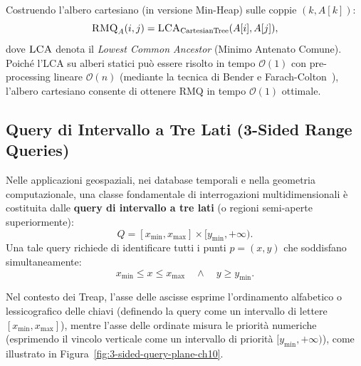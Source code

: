 Costruendo l'albero cartesiano (in versione Min-Heap) sulle coppie $(k, A[k])$:
\begin{equation}
  \textsc{RMQ}_A(i, j) = \textsc{LCA}_{\text{CartesianTree}}(A[i], A[j]),
\end{equation}
dove $\textsc{LCA}$ denota il \textit{Lowest Common Ancestor} (Minimo Antenato Comune). Poich\'e l'LCA su alberi statici pu\`o essere risolto in tempo $\mathcal{O}(1)$ con pre-processing lineare $\mathcal{O}(n)$ (mediante la tecnica di Bender e Farach-Colton~\cite{bender2000}), l'albero cartesiano consente di ottenere RMQ in tempo $\mathcal{O}(1)$ ottimale.

\subsection{Query di Intervallo a Tre Lati (3-Sided Range Queries)}
Nelle applicazioni geospaziali, nei database temporali e nella geometria computazionale, una classe fondamentale di interrogazioni multidimensionali \`e costituita dalle \textbf{query di intervallo a tre lati} (o regioni semi-aperte superiormente):
\begin{equation}
  Q = [x_{\min}, x_{\max}] \times [y_{\min}, +\infty).
\end{equation}
Una tale query richiede di identificare tutti i punti $p = (x, y)$ che soddisfano simultaneamente:
\begin{equation}
  x_{\min} \le x \le x_{\max} \quad \land \quad y \ge y_{\min}.
\end{equation}

Nel contesto dei Treap, l'asse delle ascisse esprime l'ordinamento alfabetico o lessicografico delle chiavi (definendo la query come un intervallo di lettere $[x_{\min}, x_{\max}]$), mentre l'asse delle ordinate misura le priorit\`a numeriche (esprimendo il vincolo verticale come un intervallo di priorit\`a $[y_{\min}, +\infty)$), come illustrato in Figura~\ref{fig:3-sided-query-plane-ch10}.


